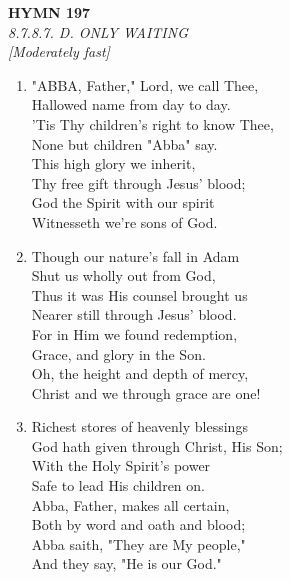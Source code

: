 \documentclass[11pt,a4paper]{article}
\begin{document}
\newpage
\begin{center}
    {\Large \textbf{HYMN 197}}
    \\
    \textit{8.7.8.7. D. ONLY WAITING}
    \\
    \textit{\small [Moderately fast]}
\end{center}
\vspace{1em}

\begin{enumerate}
    \item "ABBA, Father," Lord, we call Thee, \\
        Hallowed name from day to day. \\
        'Tis Thy children's right to know Thee, \\
        None but children "Abba" say. \\
        This high glory we inherit, \\
        Thy free gift through Jesus' blood; \\
        God the Spirit with our spirit \\
        Witnesseth we're sons of God.

    \item Though our nature's fall in Adam \\
        Shut us wholly out from God, \\
        Thus it was His counsel brought us \\
        Nearer still through Jesus' blood. \\
        For in Him we found redemption, \\
        Grace, and glory in the Son. \\
        Oh, the height and depth of mercy, \\
        Christ and we through grace are one!

    \item Richest stores of heavenly blessings \\
        God hath given through Christ, His Son; \\
        With the Holy Spirit's power \\
        Safe to lead His children on. \\
        Abba, Father, makes all certain, \\
        Both by word and oath and blood; \\
        Abba saith, "They are My people," \\
        And they say, "He is our God."


\end{enumerate}
\end{document}
